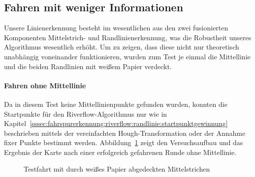 \subsection{Fahren mit weniger Informationen \dcfirstauthorshort}
\label{ssec:evaluation:messungen:weniger_infos}
Unsere Linienerkennung besteht im wesentlichen aus den zwei fusionierten Komponenten Mittelstrich- und Randlinienerkennung, was die Robustheit unseres Algorithmus wesentlich erhöht. Um zu zeigen, dass diese nicht nur theoretisch unabhängig voneinander funktionieren, wurden zum Test je einmal die Mittellinie und die beiden Randlinien mit weißem Papier verdeckt. 


\paragraph{Fahren ohne Mittellinie}
Da in diesem Test keine Mittellinienpunkte gefunden wurden, konnten die Startpunkte für den Riverflow-Algorithmus nur wie in Kapitel~\ref{sssec:fahrspurerkennung:riverflow:randlinie:startpunktgewinnung} beschrieben mittels der vereinfachten Hough-Transformation oder der Annahme fixer Punkte bestimmt werden. Abbildung~\ref{fig:evaluation:riverflow:ohneMittellinie} zeigt den Versuchsaufbau und das Ergebnis der Karte nach einer erfolgreich gefahrenen Runde ohne Mittellinie.

\begin{figure}[htbp] %
	\hfill
	\caption{Testfahrt mit durch weißes Papier abgedeckten Mittelstrichen}
	\label{fig:evaluation:riverflow:ohneMittellinie}
\end{figure}

